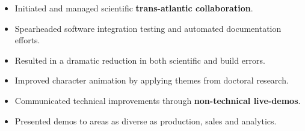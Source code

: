 \documentclass[margin]{res}
\begin{document}
\begin{sloppypar}
\begin{resume}
\begin{itemize}
    \item Initiated and managed scientific \textbf{trans-atlantic collaboration}.
    \item Spearheaded software integration testing and automated documentation efforts. 
    \item Resulted in a dramatic reduction in both scientific and build errors.
\end{itemize}

\begin{itemize}
    \item Improved character animation by applying themes from doctoral research.
    \item Communicated technical improvements through \textbf{non-technical live-demos}.
    \item Presented demos to areas as diverse as production, sales and analytics.
\end{itemize}


\end{resume}
\end{sloppypar}
\end{document}
